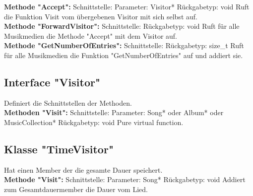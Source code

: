 \documentclass[12pt,a4paper]{article}
\begin{document}
\textbf {Methode "Accept": } 
\newline
Schnittstelle: 
\newline
Parameter: Visitor*
\newline
Rückgabetyp: void
\newline
Ruft die Funktion Visit vom übergebenen Visitor mit sich selbst auf.
\\

\textbf {Methode "ForwardVisitor": } 
\newline
Schnittstelle:
\newline
Rückgabetyp: void
\newline
Ruft für alle Musikmedien die Methode "Accept" mit dem Visitor auf.
\\

\textbf {Methode "GetNumberOfEntries": } 
\newline
Schnittstelle:
\newline
Rückgabetyp: size\_t
\newline
Ruft für alle Musikmedien die Funktion "GetNumberOfEntries" auf und addiert sie.
\\

\subsection {Interface "Visitor"}
Definiert die Schnittstellen der Methoden.
\\

\textbf {Methoden "Visit": } 
\newline
Schnittstelle: 
\newline
Parameter: Song* oder Album* oder MusicCollection*
\newline
Rückgabetyp: void
\newline
Pure virtual function.
\\

\subsection {Klasse "TimeVisitor"}
Hat einen Member der die gesamte Dauer speichert.
\\

\textbf {Methode "Visit": } 
\newline
Schnittstelle: 
\newline
Parameter: Song*
\newline
Rückgabetyp: void
\newline
Addiert zum Gesamtdauermember die Dauer vom Lied.
\\
\end{document}

